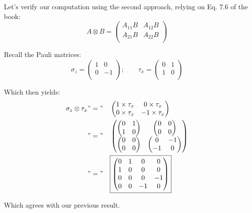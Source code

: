 \documentclass[solutions.tex]{subfiles}
\begin{document}
\hrr

Let's verify our computation using the second approach, relying
on Eq. $7.6$ of the book:
\[
	A\otimes B = \begin{pmatrix}
		A_{11}B & A_{12}B \\
		A_{21}B & A_{22}B \\
	\end{pmatrix}
\]

Recall the Pauli matrices:
\[
	\sigma_z = \begin{pmatrix}
		1 & 0 \\
		0 & -1 \\
	\end{pmatrix};\qquad
	\tau_x = \begin{pmatrix}
		0 & 1 \\
		1 & 0 \\
	\end{pmatrix}
\]

Which then yields:
\begin{equation*}\begin{aligned}
	\sigma_z\otimes\tau_x &"="&& \begin{pmatrix}
		1\times\tau_x & 0\times\tau_x \\
		0\times\tau_x & -1\times\tau_x \\
	\end{pmatrix} \\
	~ &"="&& \begin{pmatrix}
		\begin{pmatrix}
			0 & 1 \\
			1 & 0 \\
		\end{pmatrix} & \begin{pmatrix}
			0 & 0 \\
			0 & 0 \\
		\end{pmatrix} \\
		\begin{pmatrix}
			0 & 0 \\
			0 & 0 \\
		\end{pmatrix} & \begin{pmatrix}
			0 & -1 \\
			-1 & 0 \\
		\end{pmatrix} \\
	\end{pmatrix} \\
	~ &"="&& \boxed{\begin{pmatrix}
		0 & 1 & 0 & 0 \\
		1 & 0 & 0 & 0 \\
		0 & 0 & 0 & -1 \\
		0 & 0 & -1 & 0 \\
	\end{pmatrix}} \\
\end{aligned}\end{equation*}

Which agrees with our previous result.
\end{document}
